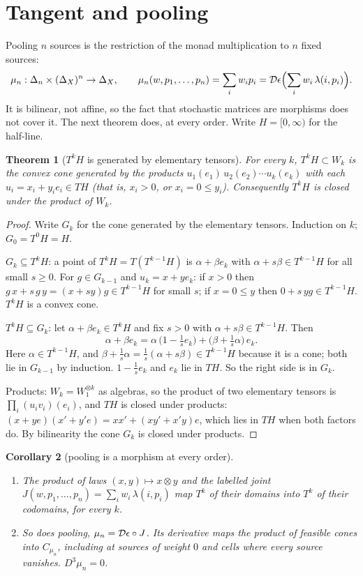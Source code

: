 \documentclass[11pt]{article}
\newtheorem{theorem}{Theorem}\newtheorem{proposition}[theorem]{Proposition}\newtheorem{lemma}[theorem]{Lemma}\newtheorem{corollary}[theorem]{Corollary}\newtheorem{conjecture}[theorem]{Conjecture}
\theoremstyle{definition}\newtheorem{definition}[theorem]{Definition}\newtheorem{remark}[theorem]{Remark}\newtheorem{example}[theorem]{Example}
\begin{document}
\section{Tangent and pooling}\label{sec:tp}
Pooling $n$ sources is the restriction of the monad multiplication to $n$ fixed sources:
\[
\mu_n:\Delta_n\times(\Delta_X)^n\to\Delta_X,\qquad\mu_n(w,p_1,\dots,p_n)=\sum_iw_ip_i=\mathcal D\epsilon\Bigl(\sum_iw_i\,\lambda(i,p_i)\Bigr).
\]
It is bilinear, not affine, so the fact that stochastic matrices are morphisms does not cover it. The next theorem does, at every order.
Write $H=[0,\infty)$ for the half-line.

\begin{theorem}[$T^kH$ is generated by elementary tensors]\label{thm:tensor}
For every $k$, $T^kH\subset W_k$ is the convex cone generated by the products $u_1(e_1)\,u_2(e_2)\cdots u_k(e_k)$ with each
$u_i=x_i+y_ie_i\in TH$ (that is, $x_i>0$, or $x_i=0\le y_i$). Consequently $T^kH$ is closed under the product of $W_k$.
\end{theorem}

\begin{proof}
Write $G_k$ for the cone generated by the elementary tensors. Induction on $k$; $G_0=T^0H=H$.

$G_k\subseteq T^kH$: a point of $T^kH=T(T^{k-1}H)$ is $\alpha+\beta e_k$ with $\alpha+s\beta\in T^{k-1}H$ for all small $s\ge0$. For $g\in G_{k-1}$ and
$u_k=x+ye_k$: if $x>0$ then $g\,x+s\,g\,y=(x+sy)g\in T^{k-1}H$ for small $s$; if $x=0\le y$ then $0+s\,yg\in T^{k-1}H$. $T^kH$ is a convex cone.

$T^kH\subseteq G_k$: let $\alpha+\beta e_k\in T^kH$ and fix $s>0$ with $\alpha+s\beta\in T^{k-1}H$. Then
\[
\alpha+\beta e_k=\alpha\,\bigl(1-\tfrac1se_k\bigr)+\bigl(\beta+\tfrac1s\alpha\bigr)\,e_k .
\]
Here $\alpha\in T^{k-1}H$, and $\beta+\tfrac1s\alpha=\tfrac1s(\alpha+s\beta)\in T^{k-1}H$ because it is a cone; both lie in $G_{k-1}$ by induction.
$1-\tfrac1se_k$ and $e_k$ lie in $TH$. So the right side is in $G_k$.

Products: $W_k=W_1^{\otimes k}$ as algebras, so the product of two elementary tensors is $\prod_i(u_iv_i)(e_i)$, and
$TH$ is closed under products: $(x+ye)(x'+y'e)=xx'+(xy'+x'y)e$, which lies in $TH$ when both factors do. By bilinearity the cone $G_k$ is
closed under products.
\end{proof}

\begin{corollary}[pooling is a morphism at every order]\label{cor:pool}
\begin{enumerate}
\item[(1)] The product of laws $(x,y)\mapsto x\otimes y$ and the labelled joint $J(w,p_1,\dots,p_n)=\sum_iw_i\,\lambda(i,p_i)$ map $T^k$ of their
  domains into $T^k$ of their codomains, for every $k$.
\item[(2)] So does pooling, $\mu_n=\mathcal D\epsilon\circ J$. Its derivative maps the product of feasible cones into $C_{\mu_n}$, including at
  sources of weight $0$ and cells where every source vanishes. $D^3\mu_n=0$.
\end{enumerate}
\end{corollary}
\end{document}
